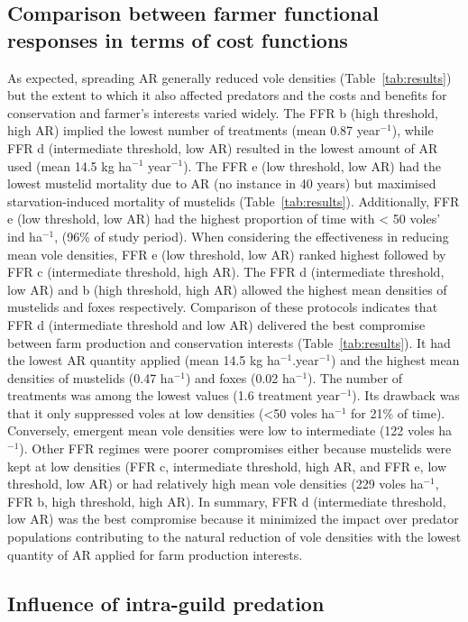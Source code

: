 \documentclass[11pt]{article}
\begin{document}
\subsection{Comparison between farmer functional responses in terms of cost functions}

As expected, spreading AR generally reduced vole densities (Table~\ref{tab:results}) but the extent to which it also affected predators and the costs and benefits for conservation and farmer’s interests varied widely. 
The FFR b (high threshold, high AR) implied the lowest number of treatments (mean 0.87 year$^{-1}$), while FFR d (intermediate threshold, low AR) resulted in the lowest amount of AR used (mean 14.5 kg ha$^{-1}$ year$^{-1}$). The FFR e (low threshold, low AR) had the lowest mustelid mortality due to AR (no instance in 40 years) but maximised starvation-induced mortality of mustelids (Table~\ref{tab:results}). Additionally, FFR e (low threshold, low AR) had the highest proportion of time with < 50 voles' ind ha$^{-1}$, (96\% of study period). When considering the effectiveness in reducing mean vole densities, FFR e (low threshold, low AR) ranked highest followed by FFR c (intermediate threshold, high AR). The FFR d (intermediate threshold, low AR) and b (high threshold, high AR) allowed the highest mean densities of mustelids and foxes respectively. 
Comparison of these protocols indicates that FFR d (intermediate threshold and low AR) delivered the best compromise between farm production and conservation interests (Table~\ref{tab:results}). It had the lowest AR quantity applied (mean 14.5 kg ha$^{-1}$.year$^{-1}$) and the highest mean densities of mustelids (0.47 ha$^{-1}$) and foxes (0.02 ha$^{-1}$). The number of treatments was among the lowest values (1.6 treatment year$^{-1}$). Its drawback was that it only suppressed voles at low densities (<50 voles ha$^{-1}$ for 21\% of time).  Conversely, emergent mean vole densities were low to intermediate (122 voles ha$^{-1}$). 
Other FFR regimes were poorer compromises either because mustelids were kept at low densities (FFR  c, intermediate threshold, high AR, and FFR e, low threshold, low AR) or had relatively high mean vole densities (229 voles ha$^{-1}$, FFR b, high threshold, high AR). In summary, FFR d (intermediate threshold, low AR) was the best compromise because it minimized the impact over predator populations contributing to the natural reduction of vole densities with the lowest quantity of AR applied for farm production interests.

\subsection{Influence of intra-guild predation}
\end{document}
